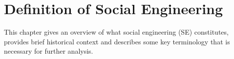 

    

\chapter{Definition of Social Engineering\label{chapter:definition}}
\begin{comment}

Guides:
    - Page limit 1-2 pages
    - Context and terminology (käsitteet), challenges and measurement criteria, values, research question analysis
    - Second to last paragraph contains the research question (RQ) and the results

TODO:
    [ ] Who is this thesis for
    [ ] Why should you read my thesis
    [ ] What is the research question and how it is answered
    [ ] How is this thesis organized, what is covered and what is deliberaly not covered and in what chapters (outline)

What to cover:
    - What is cybersecurity and why it's of paramount importance
    - What is social engineering
        - Brief history of social engineering
            - Phishing in 1996 via AOL
    - Attacks, classical social engineering attacks
        - Phishing, vishing, smishing
        - Tailgating
        - Baiting (not always considered SE)
        - Dumpster diving (not always considered SE)
    - Countermeasures, classical
        - User awareness & training programs
        - Company policy & company culture
        - Real-time threat detection
        - Vulnerability detection
    - Typical challenges
    - Motives for cybercrimes
        - Hard(er) to detect?
        - "Easy" wins?

Literature:
    - Defining Social Engineering in Cybersecurity

\end{comment}


This chapter gives an overview of what social engineering (SE) constitutes, provides brief historical context and describes some key terminology that is necessary for further analysis. %

